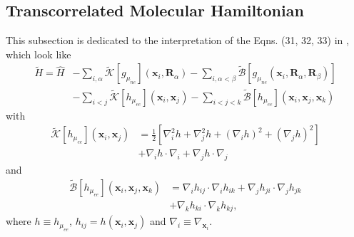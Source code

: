 \subsection{Transcorrelated Molecular Hamiltonian}
This subsection is dedicated to the interpretation of the Eqns. (31, 32, 33) in \cite{feniou2025realspacechemistryquantumcomputers}, which look like
\begin{equation}
    \begin{split}
        \tilde{H}=\hat{H}&-\sum_{i,\alpha}\tilde{\mathcal{K}}[g_{\mu_{ne}}](\mathbf{x}_i,\mathbf{R}_{\alpha})-\sum_{i,\alpha<\beta}\mathcal{\tilde{B}}[g_{\mu_{ne}}(\mathbf{x}_i,\mathbf{R}_{\alpha},\mathbf{R}_{\beta})]\\
        &-\sum_{i<j}\tilde{\mathcal{K}}[h_{\mu_{ee}}](\mathbf{x}_i,\mathbf{x}_j)-\sum_{i<j<k}\tilde{\mathcal{B}}[h_{\mu_{ee}}](\mathbf{x}_i,\mathbf{x}_j,\mathbf{x}_k)
    \end{split}
    \label{eqn:31}    
\end{equation}
with
\begin{equation}
    \begin{split}
        \tilde{\mathcal{K}}[h_{\mu_{ee}}](\mathbf{x}_i,\mathbf{x}_j)&=\frac{1}{2}\left[\nabla_i^2h+\nabla_j^2h+(\nabla_i h)^2+(\nabla_j h)^2\right]\\
        &+\nabla_i h\cdot\nabla_i+\nabla_jh\cdot\nabla_j
    \end{split}
    \label{eqn:32}
\end{equation}
and
\begin{equation}
    \begin{split}
        \tilde{\mathcal{B}}[h_{\mu_{ee}}](\mathbf{x}_i,\mathbf{x}_j,\mathbf{x}_k)&=\nabla_ih_{ij}\cdot\nabla_ih_{ik}+\nabla_j h_{ji}\cdot\nabla_j h_{jk}\\
        &+\nabla_k h_{ki}\cdot\nabla_k h_{kj},
    \end{split}
    \label{eqn:33}
\end{equation}
where $h\equiv h_{\mu_{ee}}$, $h_{ij}=h(\mathbf{x}_i,\mathbf{x}_j)$ and $\nabla_i\equiv\nabla_{\mathbf{x}_i}$.

